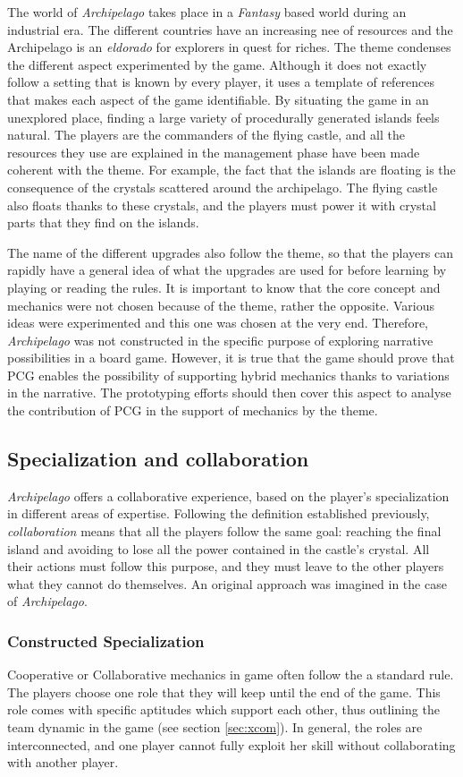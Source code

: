 The world of \textit{Archipelago} takes place in a \textit{Fantasy} based world during an industrial era. The different countries have an increasing nee of resources and the Archipelago is an \textit{eldorado} for explorers in quest for riches. The theme condenses the different aspect experimented by the game. Although it does not exactly follow a setting that is known by every player, it uses a template of references that makes each aspect of the game identifiable. By situating the game in an unexplored place, finding a large variety of procedurally generated islands feels natural. The players are the commanders of the flying castle, and all the resources they use are explained in the management phase have been made coherent with the theme. For example, the fact that the islands are floating is the consequence of the crystals scattered around the archipelago. The flying castle also floats thanks to these crystals, and the players must power it with crystal parts that they find on the islands. 

The name of the different upgrades also follow the theme, so that the players can rapidly have a general idea of what the upgrades are used for before learning by playing or reading the rules. It is important to know that the core concept and mechanics were not chosen because of the theme, rather the opposite. Various ideas were experimented and this one was chosen at the very end. Therefore, \textit{Archipelago} was not constructed in the specific purpose of exploring narrative possibilities in a board game. However, it is true that the game should prove that PCG enables the possibility of supporting hybrid mechanics thanks to variations in the narrative. The prototyping efforts should then cover this aspect to analyse the contribution of PCG in the support of mechanics by the theme.
\subsection{Specialization and collaboration}
\textit{Archipelago} offers a collaborative experience, based on the player's specialization in different areas of expertise. Following the definition established previously, \textit{collaboration} means that all the players follow the same goal: reaching the final island and avoiding to lose all the power contained in the castle's crystal. All their actions must follow this purpose, and they must leave to the other players what they cannot do themselves. An original approach was imagined in the case of \textit{Archipelago}.
\subsubsection{Constructed Specialization}
Cooperative or Collaborative mechanics in game often follow the a standard rule. The players choose one role that they will keep until the end of the game. This role comes with specific aptitudes which support each other, thus outlining the team dynamic in the game (see section \ref{sec:xcom}). In general, the roles are interconnected, and one player cannot fully exploit her skill without collaborating with another player.

